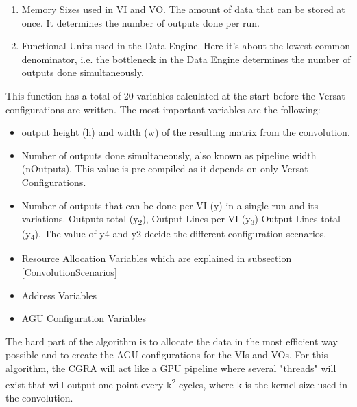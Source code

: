 \begin{enumerate}
	\item Memory Sizes used in VI and VO. The amount of data that can be stored at once. It determines the number of outputs done per run.
	\item Functional Units used in the Data Engine. Here it's about the lowest common denominator, i.e. the bottleneck in the Data Engine determines the number of outputs done simultaneously.
  \end{enumerate}
 
This function has a total of 20 variables calculated at the start before the Versat configurations are written. The most important
variables are the following:

\begin{itemize}
	\item output height (h) and width (w) of the resulting matrix from the convolution.
	\item Number of outputs done simultaneously, also known as pipeline width (nOutputs). This value is pre-compiled as it depends on only Versat Configurations.
	\item Number of outputs that can be done per VI (y) in a single run and its variations. Outputs total (y\textsubscript{2}), Output Lines per VI (y\textsubscript{3}) Output Lines total (y\textsubscript{4}).
The value of y4 and y2 decide the different configuration scenarios.
	\item Resource Allocation Variables
which are explained in subsection \ref*{ConvolutionScenarios}
	\item Address Variables
	\item AGU Configuration Variables
  \end{itemize}

The hard part of the algorithm is to allocate the data in the most efficient way possible and to create the AGU configurations
for the VIs and VOs. For this algorithm, the CGRA will act like a GPU pipeline where several "threads" will exist
that will output one point every k\textsuperscript{2} cycles, where k is the kernel size used in the convolution.

